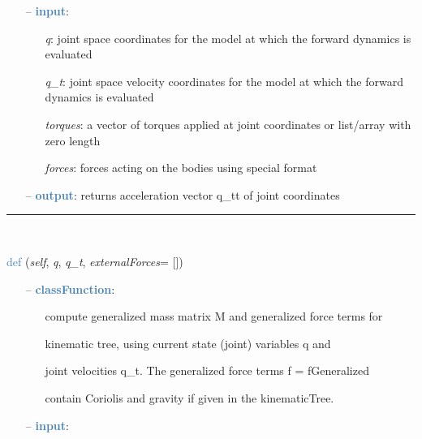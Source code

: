 \begin{itemize}[leftmargin=1.4cm]
\begin{itemize}[leftmargin=1.4cm]
\begin{itemize}[leftmargin=0.5cm]
\begin{itemize}[leftmargin=1.4cm]
\begin{itemize}[leftmargin=1.4cm]
\begin{itemize}[leftmargin=0.5cm]
\begin{itemize}[leftmargin=1.4cm]
\begin{itemize}[leftmargin=0.5cm]
\begin{itemize}[leftmargin=1.4cm]
\begin{itemize}[leftmargin=1.4cm]
\begin{itemize}[leftmargin=1.4cm]
\begin{itemize}[leftmargin=0.7cm]
\item[--]\textcolor{steelblue}{\bf input}: \vspace{-6pt}
\begin{itemize}[leftmargin=1.2cm]
\setlength{\itemindent}{-0.7cm}
\item[]{\it q}: joint space coordinates for the model at which the forward dynamics is evaluated
\item[]{\it q\_t}: joint space velocity coordinates for the model at which the forward dynamics is evaluated
\item[]{\it torques}: a vector of torques applied at joint coordinates or list/array with zero length
\item[]{\it forces}: forces acting on the bodies using special format
\end{itemize}
\item[--]\textcolor{steelblue}{\bf output}: returns acceleration vector q\_tt of joint coordinates
\vspace{12pt}\end{itemize}
%
\noindent\rule{8cm}{0.75pt}\vspace{1pt} \\ 
\begin{flushleft}
\noindent \textcolor{steelblue}{def {\bf {}}}\label{sec:kinematicTree:KinematicTree66:ComputeMassMatrixAndForceTerms}
({\it self}, {\it q}, {\it q\_t}, {\it externalForces}= [])
\end{flushleft}
\setlength{\itemindent}{0.7cm}
\begin{itemize}[leftmargin=0.7cm]
\item[--]\textcolor{steelblue}{\bf classFunction}: \vspace{-6pt}
\begin{itemize}[leftmargin=1.2cm]
\setlength{\itemindent}{-0.7cm}
\item[]compute generalized mass matrix M and generalized force terms for
\item[]kinematic tree, using current state (joint) variables q and
\item[]joint velocities q\_t. The generalized force terms f = fGeneralized
\item[]contain Coriolis and gravity if given in the kinematicTree.
\end{itemize}
\item[--]\textcolor{steelblue}{\bf input}: \vspace{-6pt}

\end{itemize}
\end{itemize}
\end{itemize}
\end{itemize}
\end{itemize}
\end{itemize}
\end{itemize}
\end{itemize}
\end{itemize}
\end{itemize}
\end{itemize}
\end{itemize}
